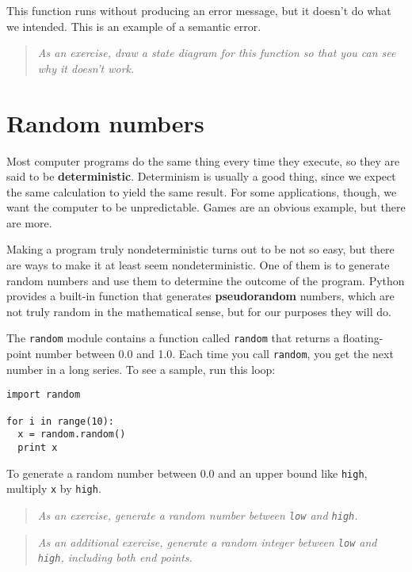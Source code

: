 This function runs without producing an error message, but it
doesn't do what we intended.  This is an example of a semantic
error.


\begin{quote}
{\em As an exercise, draw a state diagram for this function so that
you can see why it doesn't work.}
\end{quote}


\section{Random numbers}

Most computer programs do the same thing every time they execute,
so they are said to be {\bf deterministic}.  Determinism is usually a
good thing, since we expect the same calculation to yield the same
result.  For some applications, though, we want the computer to
be unpredictable.  Games are an obvious example, but there are
more.

Making a program truly nondeterministic turns out to be not so easy,
but there are ways to make it at least seem nondeterministic.  One of
them is to generate random numbers and use them to determine the
outcome of the program.  Python provides a built-in function that
generates {\bf pseudorandom} numbers, which are not truly random in
the mathematical sense, but for our purposes they will do.

The {\tt random} module contains a function called {\tt random} that
returns a floating-point number between 0.0 and 1.0.  Each time you
call {\tt random}, you get the next number in a long series.  To see a
sample, run this loop:

\beforeverb
\begin{verbatim}
import random

for i in range(10):
  x = random.random()
  print x
\end{verbatim}
\afterverb
%
To generate a random number between 0.0 and an upper bound like
{\tt high}, multiply {\tt x} by {\tt high}.

\begin{quote}
{\em As an exercise, generate a random number between {\tt low} and
{\tt high}.}
\end{quote}

\begin{quote}
{\em As an additional exercise, generate a random {\em integer}
between {\tt low} and {\tt high}, including both end points.}
\end{quote}


